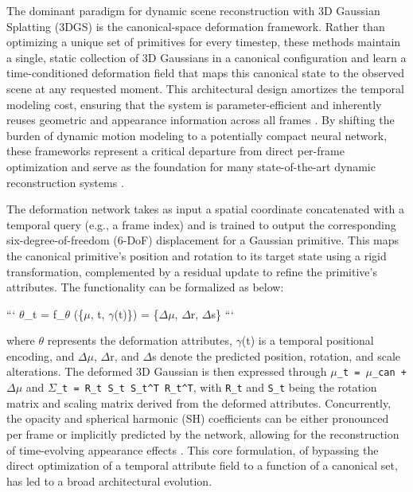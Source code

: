 \documentclass[11pt,a4paper]{article}
\begin{document}
The dominant paradigm for dynamic scene reconstruction with 3D Gaussian Splatting (3DGS) is the canonical-space deformation framework. Rather than optimizing a unique set of primitives for every timestep, these methods maintain a single, static collection of 3D Gaussians in a canonical configuration and learn a time-conditioned deformation field that maps this canonical state to the observed scene at any requested moment. This architectural design amortizes the temporal modeling cost, ensuring that the system is parameter-efficient and inherently reuses geometric and appearance information across all frames \cite{arxiv:2405.17891v1,arxiv:2311.12897v1}. By shifting the burden of dynamic motion modeling to a potentially compact neural network, these frameworks represent a critical departure from direct per-frame optimization and serve as the foundation for many state-of-the-art dynamic reconstruction systems \cite{arxiv:2401.03890v2}.

The deformation network takes as input a spatial coordinate concatenated with a temporal query (e.g., a frame index) and is trained to output the corresponding six-degree-of-freedom (6-DoF) displacement for a Gaussian primitive. This maps the canonical primitive's position and rotation to its target state using a rigid transformation, complemented by a residual update to refine the primitive's attributes. The functionality can be formalized as below:

```
$\theta$\_t = f\_$\theta$ (\{$\mu$, t, $\gamma$(t)\}) = \{$\Delta$$\mu$, $\Delta$r, $\Delta$s\}
```

where \emph{$\theta$} represents the deformation attributes, $\gamma$(t) is a temporal positional encoding, and $\Delta$$\mu$, $\Delta$r, and $\Delta$s denote the predicted position, rotation, and scale alterations. The deformed 3D Gaussian is then expressed through \texttt{$\mu$\_t = $\mu$\_can + $\Delta$$\mu$} and \texttt{$\Sigma$\_t = R\_t S\_t S\_t\textasciicircum{}T R\_t\textasciicircum{}T}, with \texttt{R\_t} and \texttt{S\_t} being the rotation matrix and scaling matrix derived from the deformed attributes. Concurrently, the opacity and spherical harmonic (SH) coefficients can be either pronounced per frame or implicitly predicted by the network, allowing for the reconstruction of time-evolving appearance effects \cite{arxiv:2311.12897v1}. This core formulation, of bypassing the direct optimization of a temporal attribute field to a function of a canonical set, has led to a broad architectural evolution.
\end{document}
